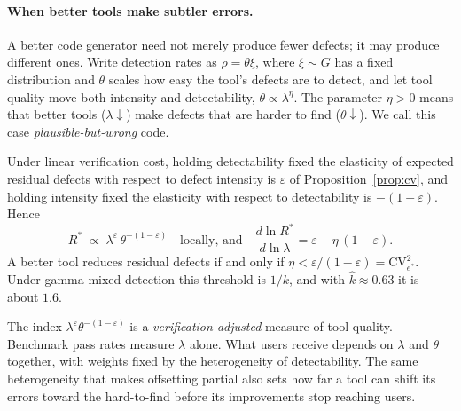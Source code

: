 
\paragraph{When better tools make subtler errors.}
A better code generator need not merely produce fewer defects; it may produce
different ones. Write detection rates as $\rho=\theta\xi$, where $\xi\sim G$ has a
fixed distribution and $\theta$ scales how easy the tool's defects are to detect, and
let tool quality move both intensity and detectability, $\theta\propto\lambda^{\eta}$.
The parameter $\eta>0$ means that better tools ($\lambda\downarrow$) make defects that are harder to
find ($\theta\downarrow$). We call this case \emph{plausible-but-wrong} code.

\begin{proposition}
\label{prop:eta}
Under linear verification cost, holding detectability fixed the elasticity of
expected residual defects with respect to defect intensity is $\varepsilon$
of Proposition~\ref{prop:cv}, and holding intensity fixed the elasticity with
respect to detectability is $-(1-\varepsilon)$. Hence
\[
  R^*\;\propto\;\lambda^{\varepsilon}\,\theta^{-(1-\varepsilon)}
  \quad\text{locally, and}\quad
  \frac{d\ln R^*}{d\ln\lambda}=\varepsilon-\eta\,(1-\varepsilon).
\]
A better tool reduces residual defects if and only if
$\eta<\varepsilon/(1-\varepsilon)=\mathrm{CV}_{e^*}^2$. Under gamma-mixed detection
this threshold is $1/k$, and with $\hat k\approx 0.63$ it is about $1.6$.
\end{proposition}

The index $\lambda^{\varepsilon}\theta^{-(1-\varepsilon)}$ is a
\emph{verification-adjusted} measure of tool quality. Benchmark pass rates measure
$\lambda$ alone. What users receive depends on $\lambda$ and $\theta$ together, with
weights fixed by the heterogeneity of detectability. The same heterogeneity that makes
offsetting partial also sets how far a tool can shift its errors toward the hard-to-find
before its improvements stop reaching users.



